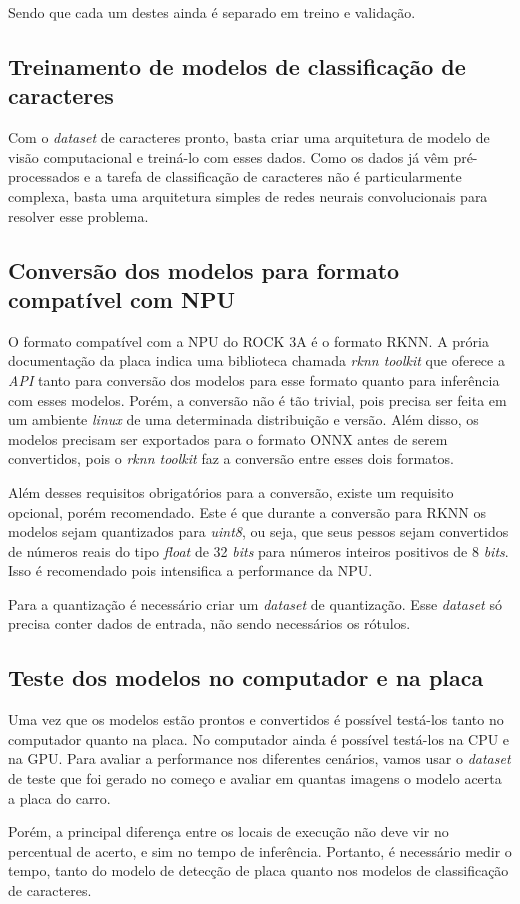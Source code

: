Sendo que cada um destes ainda é separado em treino e validação.

\subsection{Treinamento de modelos de classificação de caracteres}

Com o \textit{dataset} de caracteres pronto, basta criar uma arquitetura de modelo de visão computacional e treiná-lo com esses dados. Como os dados já vêm pré-processados e a tarefa de classificação de caracteres não é particularmente complexa, basta uma arquitetura simples de redes neurais convolucionais para resolver esse problema.

\subsection{Conversão dos modelos para formato compatível com NPU}

O formato compatível com a NPU do ROCK 3A é o formato RKNN. A prória documentação da placa indica uma biblioteca chamada \textit{rknn toolkit} que oferece a \textit{API} tanto para conversão dos modelos para esse formato quanto para inferência com esses modelos. Porém, a conversão não é tão trivial, pois precisa ser feita em um ambiente \textit{linux} de uma determinada distribuição e versão. Além disso, os modelos precisam ser exportados para o formato ONNX antes de serem convertidos, pois o \textit{rknn toolkit} faz a conversão entre esses dois formatos.

Além desses requisitos obrigatórios para a conversão, existe um requisito opcional, porém recomendado. Este é que durante a conversão para RKNN os modelos sejam quantizados para \textit{uint8}, ou seja, que seus pessos sejam convertidos de números reais do tipo \textit{float} de 32 \textit{bits} para números inteiros positivos de 8 \textit{bits}. Isso é recomendado pois intensifica a performance da NPU.

Para a quantização é necessário criar um \textit{dataset} de quantização. Esse \textit{dataset} só precisa conter dados de entrada, não sendo necessários os rótulos.

\subsection{Teste dos modelos no computador e na placa}

Uma vez que os modelos estão prontos e convertidos é possível testá-los tanto no computador quanto na placa. No computador ainda é possível testá-los na CPU e na GPU. Para avaliar a performance nos diferentes cenários, vamos usar o \textit{dataset} de teste que foi gerado no começo e avaliar em quantas imagens o modelo acerta a placa do carro.

Porém, a principal diferença entre os locais de execução não deve vir no percentual de acerto, e sim no tempo de inferência. Portanto, é necessário medir o tempo, tanto do modelo de detecção de placa quanto nos modelos de classificação de caracteres.